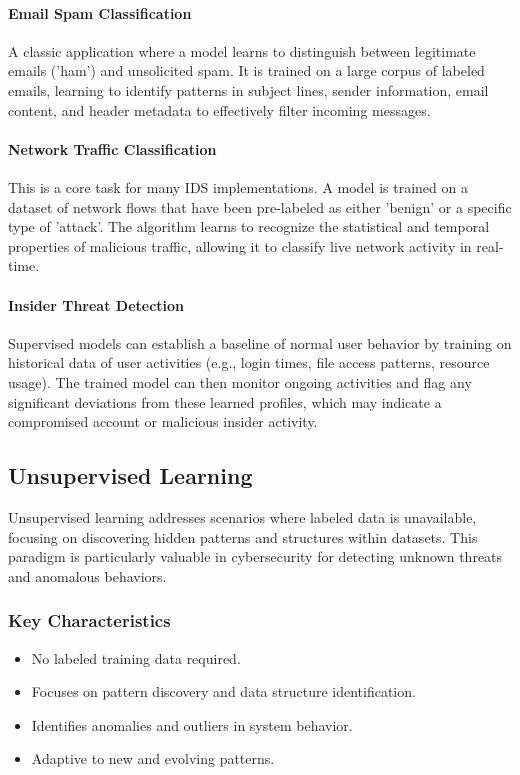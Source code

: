 \documentclass[16pt]{report}
\begin{document}
\paragraph{Email Spam Classification}
A classic application where a model learns to distinguish between legitimate emails ('ham') and unsolicited spam. It is trained on a large corpus of labeled emails, learning to identify patterns in subject lines, sender information, email content, and header metadata to effectively filter incoming messages.

\paragraph{Network Traffic Classification}
This is a core task for many IDS implementations. A model is trained on a dataset of network flows that have been pre-labeled as either 'benign' or a specific type of 'attack'. The algorithm learns to recognize the statistical and temporal properties of malicious traffic, allowing it to classify live network activity in real-time.

\paragraph{Insider Threat Detection}
Supervised models can establish a baseline of normal user behavior by training on historical data of user activities (e.g., login times, file access patterns, resource usage). The trained model can then monitor ongoing activities and flag any significant deviations from these learned profiles, which may indicate a compromised account or malicious insider activity.

\subsection{Unsupervised Learning}
Unsupervised learning addresses scenarios where labeled data is unavailable, focusing on discovering hidden patterns and structures within datasets. This paradigm is particularly valuable in cybersecurity for detecting unknown threats and anomalous behaviors.

\subsubsection{Key Characteristics}
\begin{itemize}
    \item No labeled training data required.
    \item Focuses on pattern discovery and data structure identification.
    \item Identifies anomalies and outliers in system behavior.
    \item Adaptive to new and evolving patterns.
\end{itemize}
\end{document}
